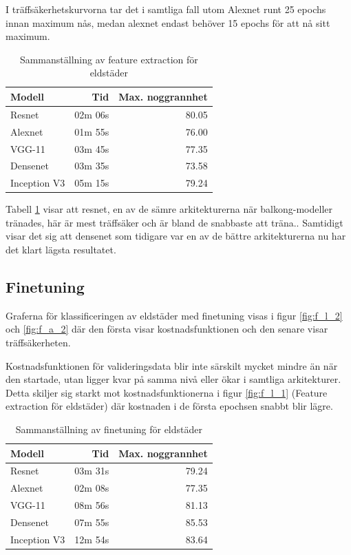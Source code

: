 \documentclass[]{kththesis}
\begin{document}
I träffsäkerhetskurvorna tar det i samtliga fall utom Alexnet runt 25 epochs innan maximum nås, medan alexnet endast behöver 15 epochs för att nå sitt maximum.


\begin{table}[!htbp]
  \centering
  \begin{tabular}{|l|r|r|}
    Modell & Tid & Max. noggrannhet \\ 
    \hline
    Resnet       & 02m 06s & 80.05 \\
    Alexnet      & 01m 55s & 76.00 \\
    VGG-11       & 03m 45s & 77.35 \\
    Densenet     & 03m 35s & 73.58 \\
    Inception V3 & 05m 15s & 79.24 \\
  \end{tabular}
  \caption{Sammanställning av feature extraction för eldstäder}
  \label{fig:sam_3}
\end{table}


Tabell \ref{fig:sam_3} visar att resnet, en av de sämre arkitekturerna när balkong-modeller tränades, här är mest träffsäker och är bland de snabbaste att träna..
Samtidigt visar det sig att densenet som tidigare var en av de bättre arkitekturerna nu har det klart lägsta resultatet.

\subsection{Finetuning}
Graferna för klassificeringen av eldstäder med finetuning visas i figur \ref{fig:f_l_2} och \ref{fig:f_a_2} där den första visar kostnadsfunktionen och den senare visar träffsäkerheten.

Kostnadsfunktionen för valideringsdata blir inte särskilt mycket mindre än när den startade, utan ligger kvar på samma nivå eller ökar i samtliga arkitekturer.
Detta skiljer sig starkt mot kostnadsfunktionerna i figur \ref{fig:f_l_1} (Feature extraction för eldstäder) där kostnaden i de första epochsen snabbt blir lägre. 


\begin{table}[!htbp]
  \centering
  \begin{tabular}{|l|r|r|}
    Modell & Tid & Max. noggrannhet \\ 
    \hline
    Resnet       & 03m 31s & 79.24 \\
    Alexnet      & 02m 08s & 77.35 \\
    VGG-11       & 08m 56s & 81.13 \\
    Densenet     & 07m 55s & 85.53 \\
    Inception V3 & 12m 54s & 83.64 \\
  \end{tabular}
  \caption{Sammanställning av finetuning för eldstäder}
  \label{fig:sam_4}  
\end{table}
\end{document}
